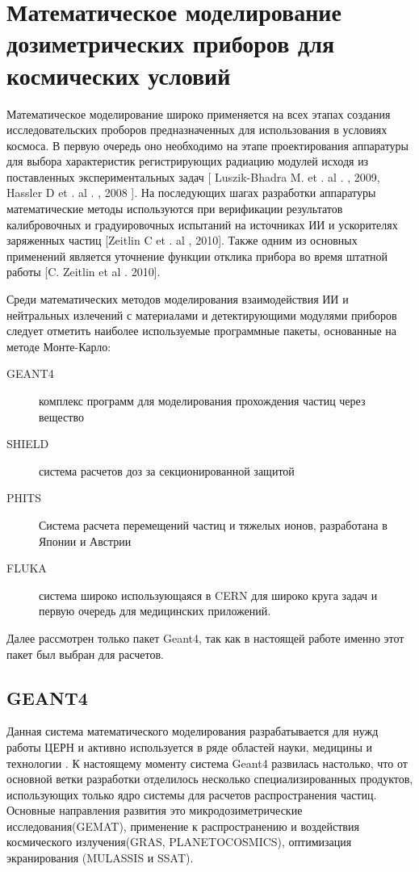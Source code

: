 \section{Математическое моделирование дозиметрических приборов для космических условий}

Математическое моделирование широко применяется на всех этапах создания исследовательских проборов предназначенных для использования в условиях космоса. В первую очередь оно необходимо на этапе проектирования аппаратуры для выбора характеристик регистрирующих радиацию модулей исходя из поставленных экспериментальных задач [ Luszik-Bhadra M.  et . al . ,  2009,  Hassler  D et .  al . ,  2008 ]. На последующих шагах разработки аппаратуры математические методы используются при верификации результатов калибровочных и градуировочных испытаний на источниках ИИ и ускорителях заряженных частиц [Zeitlin C et . al ,  2010]. Также одним из основных применений является уточнение функции отклика прибора во время штатной работы [C. Zeitlin et al . 2010]. 


Среди математических методов моделирования взаимодействия ИИ и нейтральных излечений с материалами и детектирующими модулями приборов следует отметить наиболее используемые программные пакеты, основанные на методе Монте-Карло:


\begin{description}
	\item[GEANT4] комплекс программ для моделирования прохождения частиц через вещество\cite{Allison2006}
	\item[SHIELD] система расчетов доз за секционированной защитой  	
	\item[PHITS] Система расчета перемещений частиц и тяжелых ионов, 
	разработана в Японии и Австрии%
	\item[FLUKA] система широко использующаяся в CERN для широко круга задач и 
	первую очередь для медицинских приложений\cite{Fasso2003, fluka2014}.
\end{description}

Далее рассмотрен только пакет Geant4, так как в настоящей работе именно этот пакет 
был выбран для расчетов. 


\subsection{GEANT4}

Данная система математического моделирования разрабатывается для нужд работы 
ЦЕРН и активно используется в ряде областей науки, медицины и технологии 
\cite{Agostinelli2003}.
К настоящему моменту система Geant4 развилась настолько, что от основной ветки 
разработки отделилось несколько специализированных продуктов, использующих 
только ядро системы для расчетов распространения частиц. Основные направления 
развития это микродозиметрические исследования(GEMAT), применение к 
распространению и 
воздействия космического излучения(GRAS, PLANETOCOSMICS), оптимизация 
экранирования (MULASSIS и SSAT). 

